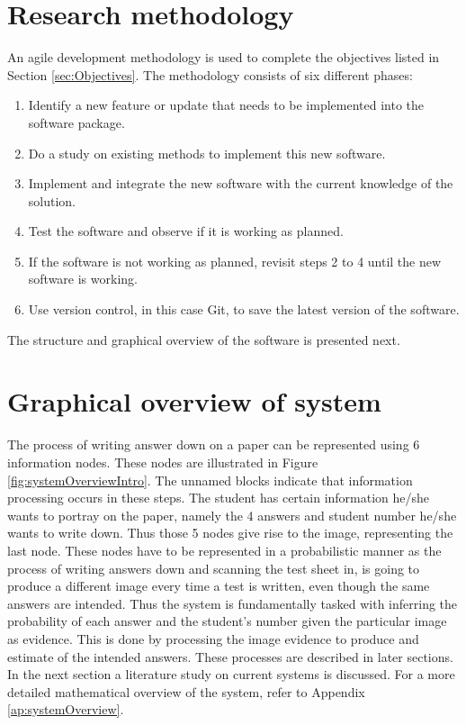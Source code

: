 \section{Research methodology}

An agile development methodology is used to complete the objectives listed in Section \ref{sec:Objectives}. The methodology consists of six different phases:
\begin{enumerate}
\item Identify a new feature or update that needs to be implemented into the software package.
\item Do a study on existing methods to implement this new software.
\item Implement and integrate the new software with the current knowledge of the solution.
\item Test the software and observe if it is working as planned.
\item If the software is not working as planned, revisit steps 2 to 4 until the new software is working.
\item Use version control, in this case Git, to save the latest version of the software.
\end{enumerate}


The structure and graphical overview of the software is presented next.

\section{Graphical overview of system}
The process of writing answer down on a paper can be represented using 6 information nodes. These nodes are illustrated in Figure \ref{fig:systemOverviewIntro}. The unnamed blocks indicate that information processing occurs in these steps. The student has certain information he/she wants to portray on the paper, namely the 4 answers and student number he/she wants to write down. Thus those 5 nodes give rise to the image, representing the last node. These nodes have to be represented in a probabilistic manner as the process of writing answers down and scanning the test sheet in, is going to produce a different image every time a test is written, even though the same answers are intended. Thus the system is fundamentally tasked with inferring the probability of each answer and the student's number given the particular image as evidence. This is done by processing the image evidence to produce and estimate of the intended answers. These processes are described in later sections. In the next section a literature study on current systems is discussed. For a more detailed mathematical overview of the system, refer to Appendix \ref{ap:systemOverview}.

